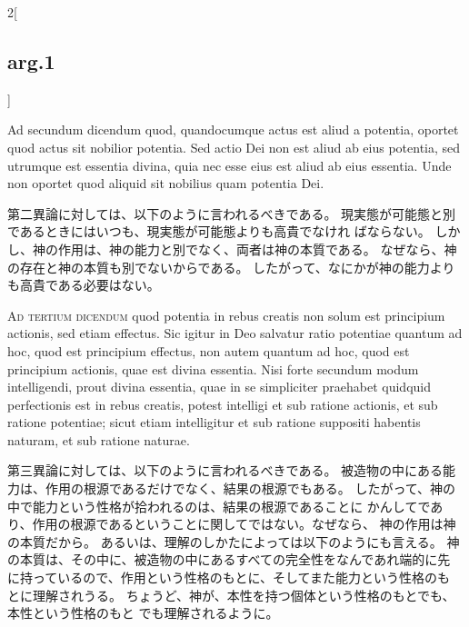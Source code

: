 \documentclass[paper=a4paper,fontsize=10pt,jafontsize=9pt,titlepage]{jlreq}
\begin{document}
\begin{paracol}{2}[\subsection{arg.1}]
\switchcolumn*[\subsection{ad.2}]

Ad secundum dicendum quod, quandocumque actus
est aliud a potentia, oportet quod actus sit nobilior potentia. Sed
actio Dei non est aliud ab eius potentia, sed utrumque est essentia
divina, quia nec esse eius est aliud ab eius essentia. Unde non oportet
quod aliquid sit nobilius quam potentia Dei.

\switchcolumn

第二異論に対しては、以下のように言われるべきである。
現実態が可能態と別であるときにはいつも、現実態が可能態よりも高貴でなけれ
 ばならない。
しかし、神の作用は、神の能力と別でなく、両者は神の本質である。
なぜなら、神の存在と神の本質も別でないからである。
したがって、なにかが神の能力よりも高貴である必要はない。

\switchcolumn*[\subsection{ad.3}]

{\scshape Ad tertium dicendum} quod potentia in rebus
creatis non solum est principium actionis, sed etiam effectus. Sic
igitur in Deo salvatur ratio potentiae quantum ad hoc, quod est
principium effectus, non autem quantum ad hoc, quod est principium
actionis, quae est divina essentia. Nisi forte secundum modum
intelligendi, prout divina essentia, quae in se simpliciter praehabet
quidquid perfectionis est in rebus creatis, potest intelligi et sub
ratione actionis, et sub ratione potentiae; sicut etiam intelligitur et
sub ratione suppositi habentis naturam, et sub ratione naturae.

\switchcolumn

第三異論に対しては、以下のように言われるべきである。
被造物の中にある能力は、作用の根源であるだけでなく、結果の根源でもある。
したがって、神の中で能力という性格が拾われるのは、結果の根源であることに
 かんしてであり、作用の根源であるということに関してではない。なぜなら、
 神の作用は神の本質だから。
あるいは、理解のしかたによっては以下のようにも言える。
神の本質は、その中に、被造物の中にあるすべての完全性をなんであれ端的に先
 に持っているので、作用という性格のもとに、そしてまた能力という性格のも
 とに理解されうる。
ちょうど、神が、本性を持つ個体という性格のもとでも、本性という性格のもと
 でも理解されるように。

\switchcolumn*[\subsection{ad.4}]


\end{paracol}
\end{document}
